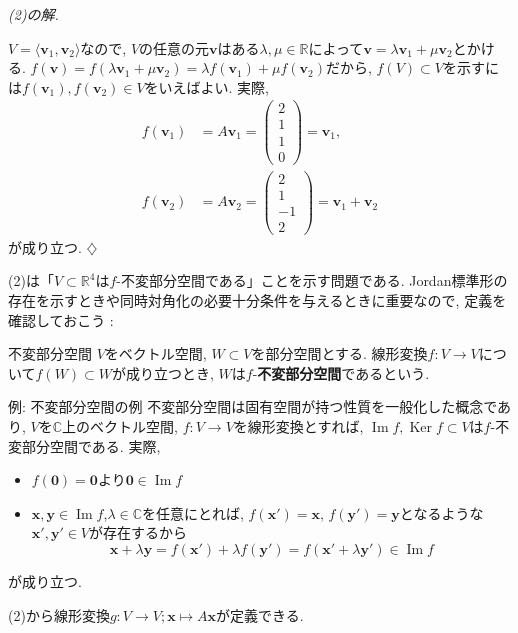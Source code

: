 \documentclass[titlepage]{jsarticle}
\numberwithin{equation}{section}
\newcommand{\R}{\mathbb{R}}%
\newcommand{\C}{\mathbb{C}}%
\newcommand{\Ker}{\operatorname{Ker}}
\renewcommand{\Im}{\operatorname{Im}}
\newenvironment{kaitou}[1][解]{%
\begin{proofbox}%
\textit{#1. }\ignorespaces
}{%
\hfill$\diamondsuit$%
\end{proofbox}%
}
\begin{document}
\begin{kaitou}[(2)の解]
$V = \langle \bm{v}_1, \bm{v}_2 \rangle$なので, $V$の任意の元$\bm{v}$はある$\lambda, \mu \in \R$によって$\bm{v} = \lambda\bm{v}_1 + \mu\bm{v}_2$とかける. $f(\bm{v}) = f(\lambda\bm{v}_1 + \mu \bm{v}_2) = \lambda f(\bm{v}_1) + \mu f(\bm{v}_2)$だから, $f(V) \subset V$を示すには$f(\bm{v}_1), f(\bm{v}_2) \in V$をいえばよい. 実際, 
\begin{align}
f(\bm{v}_1) &= A\bm{v}_1 =
\begin{pmatrix}
2\\
1\\
1\\
0
\end{pmatrix}
= \bm{v}_1, \label{tmu2025-2a} \\
f(\bm{v}_2) &= A\bm{v}_2 = 
\begin{pmatrix}
2\\
1\\
-1\\
2
\end{pmatrix}
= \bm{v}_1 + \bm{v}_2 \label{tmu2025-2b} 
\end{align}
が成り立つ.
\end{kaitou}
(2)は「$V \subset \R^4$は$f$-不変部分空間である」ことを示す問題である. Jordan標準形の存在を示すときや同時対角化の必要十分条件を与えるときに重要なので, 定義を確認しておこう : 
\begin{dfn}{不変部分空間}{}
$V$をベクトル空間, $W \subset V$を部分空間とする. 線形変換$f : V \to V$について$f(W) \subset W$が成り立つとき, $W$は$f$-\textbf{不変部分空間}であるという.
\end{dfn}
\begin{ex}{例: 不変部分空間の例}
不変部分空間は固有空間が持つ性質を一般化した概念であり, $V$を$\C$上のベクトル空間, $f : V \to V$を線形変換とすれば, $\Im f, \Ker f \subset V$は$f$-不変部分空間である. 実際, 
\begin{itemize}
\item $f(\bm{0}) = \bm{0}$より$\bm{0} \in \Im f$
\item $\bm{x}, \bm{y} \in \Im f$,$\lambda \in \C$を任意にとれば, $f(\bm{x}') = \bm{x},\, f(\bm{y}') = \bm{y}$となるような$\bm{x}', \bm{y}' \in V$が存在するから
\[
\bm{x} + \lambda\bm{y} = f(\bm{x}') + \lambda f(\bm{y}') = f(\bm{x}' + \lambda\bm{y}') \in \Im f
\]
\end{itemize}
が成り立つ.
\end{ex}
(2)から線形変換$g : V \to V ; \bm{x} \mapsto A\bm{x}$が定義できる.
\end{document}

